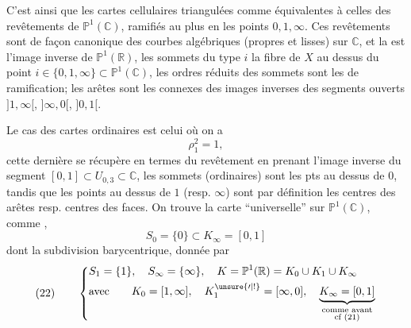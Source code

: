 
C'est ainsi que les  cartes cellulaires triangulées   comme équivalentes à celles des  revêtements  de \unsure{$\ast$} $\mathbb P^1(\mathbb C)$, ramifiés au plus en les points $0,1,\infty$. Ces revêtements sont de façon canonique des courbes algébriques (propres et lisses) sur $\mathbb C$, et la   est l'image inverse de  $\mathbb P^1(\mathbb R)$, les sommets du type $i$   la fibre de $X$ au dessus du point $i\in\{0,1,\infty\}\subset\mathbb P^1(\mathbb C)$, les ordres réduits des sommets sont les  de ramification; les arêtes sont les  connexes des images inverses des segments ouverts $]1,\infty[$, $]\infty,0[$, $]0,1[$.

Le cas des  cartes ordinaires est celui où on a
\[
\rho_1^2=1,
\]
cette dernière se récupère en termes du revêtement en prenant l'image inverse du segment $[0,1]\subset U_{0,3}\subset\mathbb C$, les sommets (ordinaires) sont les pts au dessus de $0$, tandis que les points au dessus de $1$ (resp. $\infty$) sont par définition les centres des arêtes resp. centres des faces. On trouve la carte  ``universelle''  sur $\mathbb P^1(\mathbb C)$, comme ,
\[
S_0=\{0\}\subset K_\infty=[0,1]
\]
dont la subdivision barycentrique, donnée par
\[
\text{(22)}\qquad
\left\{\begin{aligned}
&S_1=\{1\},\quad S_\infty=\{\infty\},\quad K=\mathbb P^1(\mathbb R)=K_0\cup K_1\cup K_\infty\\
&\text{avec}\qquad K_0=[1,\infty],\quad K_1^{\unsure{\prime|!}}=[\infty,0],\quad
\underbrace{K_\infty=[0,1]}_{\substack{\text{comme avant}\\\text{cf (21)}}}
\end{aligned}\right.
\]

